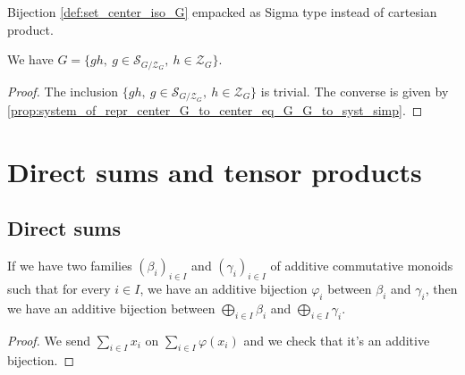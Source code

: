 \begin{definition}
    \label{system_of_repr_set_center_iso_G_sigma}
    \leanok
    Bijection \ref{def:set_center_iso_G} empacked as Sigma type instead of cartesian product.
\end{definition}

\begin{proposition}
    \label{prop:system_of_repr_center_set_center_eq_G }
    \leanok
    We have $G = \{gh,\ g\in \mathcal{S}_{G/\mathcal{Z}_G},\ h\in \mathcal{Z}_G\}$.
\end{proposition}
\begin{proof}
    \leanok
    The inclusion $\{gh,\ g\in \mathcal{S}_{G/\mathcal{Z}_G},\ h\in \mathcal{Z}_G\}$ is trivial.
    The converse is given by \ref{prop:system_of_repr_center_G_to_center_eq_G_G_to_syst_simp}.
\end{proof}


\section{Direct sums and tensor products}

\subsection{Direct sums}

\begin{definition}
    \label{def:DirectSum_equiv}
    \uses{}
    \leanok
    If we have two families $(\beta_i)_{i\in I}$ and $(\gamma_i)_{i\in I}$ of additive commutative
    monoids such that for every $i\in I$, we have an additive bijection $\varphi_i$ between 
    $\beta_i$ and $\gamma_i$, then we have an additive bijection
    between $\bigoplus\limits_{i\in I}\beta_i$ and $\bigoplus\limits_{i\in I}\gamma_i$.
    \begin{proof}
        \leanok
        We send $\sum\limits_{i\in I}x_i$ on $\sum\limits_{i\in I}\varphi(x_i)$ and we check
        that it's an additive bijection. 
    \end{proof}
\end{definition}

